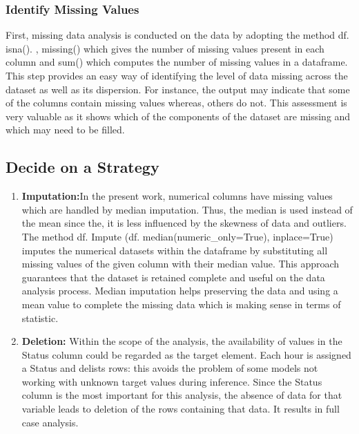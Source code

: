 \documentclass[12pt, a4paper,oneside]{book}
\numberwithin{equation}{section}
\begin{document}
\subsubsection{Identify Missing Values} 

First, missing data analysis is conducted on the data by adopting the method df. isna(). , missing() which gives the number of missing values present in each column and sum() which computes the number of missing values in a dataframe. This step provides an easy way of identifying the level of data missing across the dataset as well as its dispersion. For instance, the output may indicate that some of the columns contain missing values whereas, others do not. This assessment is very valuable as it shows which of the components of the dataset are missing and which may need to be filled. 

\subsection{Decide on a Strategy}

\begin{enumerate}
\item \textbf{Imputation:}In the present work, numerical columns have missing values which are handled by median imputation. Thus, the median is used instead of the mean since the, it is less influenced by the skewness of data and outliers. The method df. Impute (df. median(numeric\_only=True), inplace=True) imputes the numerical datasets within the dataframe by substituting all missing values of the given column with their median value. This approach guarantees that the dataset is retained complete and useful on the data analysis process. Median imputation helps preserving the data and using a mean value to complete the missing data which is making sense in terms of statistic. 

\vspace{7mm}
\item \textbf{Deletion:} Within the scope of the analysis, the availability of values in the Status column could be regarded as the target element. Each hour is assigned a Status and delists rows: this avoids the problem of some models not working with unknown target values during inference. Since the Status column is the most important for this analysis, the absence of data for that variable leads to deletion of the rows containing that data. It results in full case analysis.
\end{enumerate}
\end{document}
